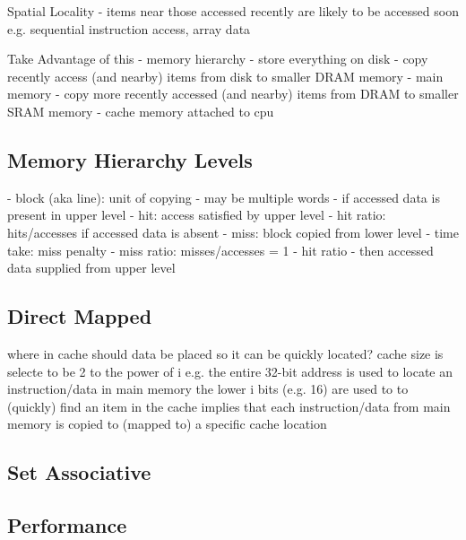 Spatial Locality
- items near those accessed recently are likely to be accessed soon
e.g. sequential instruction access, array data

Take Advantage of this
- memory hierarchy
- store everything on disk
- copy recently access (and nearby) items
  from disk to smaller DRAM memory
  - main memory
- copy more recently accessed (and nearby) items
from DRAM to smaller SRAM memory
  - cache memory attached to cpu

\subsection{Memory Hierarchy Levels}
- block (aka line): unit of copying
- may be multiple words
- if accessed data is present in upper level
  - hit: access satisfied by upper level
  - hit ratio: hits/accesses
if accessed data is absent
  - miss: block copied from lower level
    - time take: miss penalty
    - miss ratio: misses/accesses
      = 1 - hit ratio
    - then accessed data supplied from upper level

\subsection{Direct Mapped}
where in cache should data be placed so it can be quickly located?
cache size is selecte to be 2 to the power of i e.g.
the entire 32-bit address is used to locate an instruction/data in main memory
the lower i bits (e.g. 16) are used to to (quickly) find an item in the cache
implies that each instruction/data from main memory is copied to (mapped to) a specific
cache location

\subsection{Set Associative}

\subsection{Performance}
